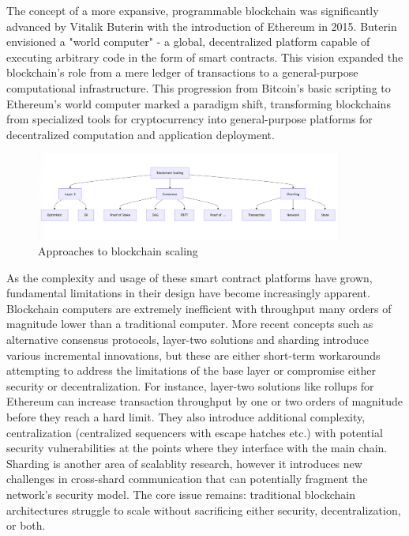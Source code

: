 \documentclass{article}
\begin{document}
\vspace{2mm}

The concept of a more expansive, programmable blockchain was significantly advanced by Vitalik Buterin with the introduction of Ethereum in 2015. Buterin envisioned a "world computer" - a global, decentralized platform capable of executing arbitrary code in the form of smart contracts. This vision expanded the blockchain's role from a mere ledger of transactions to a general-purpose computational infrastructure. This progression from Bitcoin's basic scripting to Ethereum's world computer marked a paradigm shift, transforming blockchains from specialized tools for cryptocurrency into general-purpose platforms for decentralized computation and application deployment.

\begin{figure}[H]
    \centering
    \includegraphics[width=0.9\textwidth]{scaling.png}
    \caption{Approaches to blockchain scaling }
    \label{fig:scaling}
\end{figure}


As the complexity and usage of these smart contract platforms have grown, fundamental limitations in their design have become increasingly apparent. Blockchain computers are extremely inefficient with throughput many orders of magnitude lower than a traditional computer. More recent concepts such as alternative consensus protocols, layer-two solutions and sharding introduce various incremental innovations, but these are either short-term workarounds attempting to address the limitations of the base layer or compromise either security or decentralization. For instance, layer-two solutions like rollups for Ethereum can increase transaction throughput by one or two orders of magnitude before they reach a hard limit. They also introduce additional complexity, centralization (centralized sequencers with escape hatches etc.) with potential security vulnerabilities at the points where they interface with the main chain. Sharding is another area of scalablity research, however it introduces new challenges in cross-shard communication that can potentially fragment the network's security model. The core issue remains: traditional blockchain architectures struggle to scale without sacrificing either security, decentralization, or both. 
\vspace{2mm}
\end{document}
